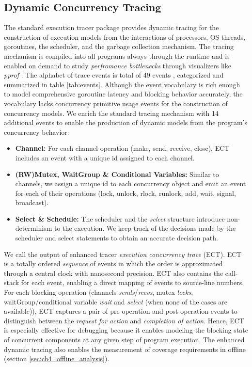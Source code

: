 \subsection{Dynamic Concurrency Tracing}
\label{sec:ch4_dynamic_tracing}
The standard execution tracer package \cite{go-package-trace,go-cmd-trace} provides dynamic tracing for the construction of execution models from the interactions of processors, OS threads, goroutines, the scheduler, and the garbage collection mechanism.
%
The tracing mechanism is compiled into all programs always through the runtime and is enabled on demand to study \textit{perfromance bottlenecks} through visualizers like \textit{pprof} \cite{go-profile-blog}.
%
The alphabet of trace events is total of 49 events \cite{goParserSource}, categorized and summarized in table \ref{tab:events}.
%
Although the event vocabulary is rich enough to model comprehensive goroutine latency and blocking behavior accurately,
the vocabulary lacks concurrency primitive usage events for the construction of concurrency models.
%
We enrich the standard tracing mechanism with 14 additional events to enable the production of dynamic models from the program's concurrency behavior:
\begin{itemize}
    \item \textbf{Channel:} For each channel operation (make, send, receive, close), ECT includes an event with a unique id assigned to each channel.
    \item \textbf{(RW)Mutex, WaitGroup \& Conditional Variables:} Similar to channels, we assign a unique id to each concurrency object and emit an event for each of their operations (lock, unlock, rlock, runlock, add, wait, signal, broadcast).
    \item \textbf{Select \& Schedule:} The scheduler and the \textit{select} structure introduce non-determinism to the execution. We keep track of the decisions made by the scheduler and select statements to obtain an accurate decision path.
\end{itemize}

We call the output of enhanced tracer \textit{execution concurrency trace} (ECT).
%
ECT is a totally ordered \textit{sequence} of events in which the order is approximated through a central clock with nanosecond precision.
%
ECT also contains the call-stack for each event, enabling a direct mapping of events to source-line numbers.
%
For each blocking operation (channels \textit{sends}/\textit{recvs}, mutex \textit{locks}, waitGroup/conditional variable \textit{wait} and \textit{select} (when none of the cases are available)), ECT captures a pair of pre-operation and post-operation events to distinguish between the \textit{request for action} and \textit{completion of action}.
%
Hence, ECT is especially effective for debugging because it enables modeling the blocking state of concurrent components at any given step of program execution.
%
The enhanced dynamic tracing also enables the measurement of coverage requirements in offline (section \ref{sec:ch4_offline_analysis}).

